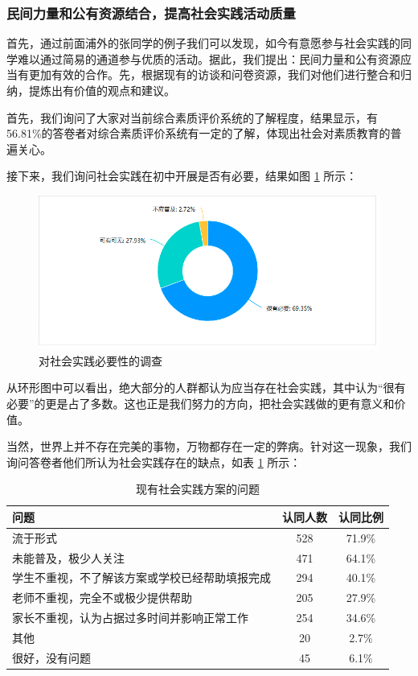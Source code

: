 \documentclass[12pt,UTF8]{ctexart}
\begin{document}
\subsubsection {民间力量和公有资源结合，提高社会实践活动质量}
\par {
	
	首先，通过前面浦外的张同学的例子我们可以发现，如今有意愿参与社会实践的同学难以通过简易的通道参与优质的活动。据此，我们提出：民间力量和公有资源应当有更加有效的合作。先，根据现有的访谈和问卷资源，我们对他们进行整合和归纳，提炼出有价值的观点和建议。
}
\par {
	首先，我们询问了大家对当前综合素质评价系统的了解程度，结果显示，有56.81\%的答卷者对综合素质评价系统有一定的了解，体现出社会对素质教育的普遍关心。
}
\par {
	接下来，我们询问社会实践在初中开展是否有必要，结果如图 \ref{fig:9} 所示：
}
\begin{figure}[!htb]
	\centering
	\includegraphics[width=4.6in]{chart/9.png}
	\caption{对社会实践必要性的调查}
	\label{fig:9}
\end{figure}
\par {
	从环形图中可以看出，绝大部分的人群都认为应当存在社会实践，其中认为“很有必要”的更是占了多数。这也正是我们努力的方向，把社会实践做的更有意义和价值。
}
\par {
	当然，世界上并不存在完美的事物，万物都存在一定的弊病。针对这一现象，我们询问答卷者他们所认为社会实践存在的缺点，如表 \ref{fig:10} 所示：
	\begin{table}[htbp]
		\centering
		\caption{现有社会实践方案的问题}
		\label{fig:10}
		\begin{tabular}{lcc}
			\hline
			\hline
			{\bf 问题} & {\bf 认同人数} & {\bf 认同比例}\\ \hline
			流于形式 & 528 & 71.9\% \\
			未能普及，极少人关注 & 471 & 64.1\% \\
			学生不重视，不了解该方案或学校已经帮助填报完成 & 294 & 40.1\% \\
			老师不重视，完全不或极少提供帮助 & 205 & 27.9\% \\
			家长不重视，认为占据过多时间并影响正常工作 & 254 & 34.6\% \\
			其他 & 20 & 2.7\% \\
			很好，没有问题 & 45 & 6.1\% \\
			\hline
			\hline
		\end{tabular}
	\end{table}
}
\end{document}
